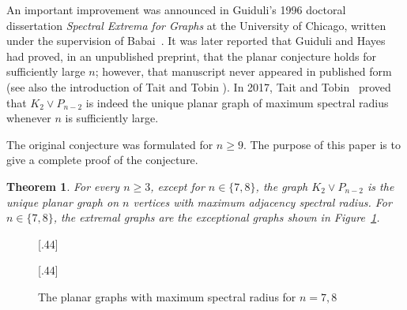 \documentclass[11pt]{article}
\theoremstyle{plain}
\newtheorem{theorem}{Theorem}[section]
\theoremstyle{definition}
\numberwithin{equation}{section}
\begin{document}
An important improvement was announced in Guiduli's 1996 doctoral dissertation \emph{Spectral Extrema for Graphs}
at the University of Chicago, written under the supervision of Babai~\cite{Guiduli1996}. It was later reported 
that Guiduli and Hayes had proved, in an unpublished preprint, that the planar conjecture holds for
sufficiently large $n$; however, that manuscript never appeared in published form (see also the introduction 
of Tait and Tobin \cite{TaitTobin2017}). In 2017, Tait and Tobin~\cite{TaitTobin2017} proved
that $K_2\vee P_{n-2}$ is indeed the unique planar graph of maximum spectral radius whenever $n$ is sufficiently large.

The original conjecture was formulated for $n\geq 9$. The purpose of this paper is to give a complete proof of the conjecture. 

\begin{theorem}\label{thm:main}
For every $n\geq 3$, except for $n\in\{7,8\}$, the graph $K_2\vee P_{n-2}$ is the unique 
planar graph on $n$ vertices with maximum adjacency spectral radius. For $n\in\{7,8\}$, 
the extremal graphs are the exceptional graphs shown in Figure~\ref{fig:extremal-graphs-7-8}.
\end{theorem}

\begin{figure}[htbp]
\centering
{}[.44\textwidth]{%
}
[.44\textwidth]{%
}
\caption{The planar graphs with maximum spectral radius for $n=7,8$}
\label{fig:extremal-graphs-7-8}
\end{figure}
\end{document}

